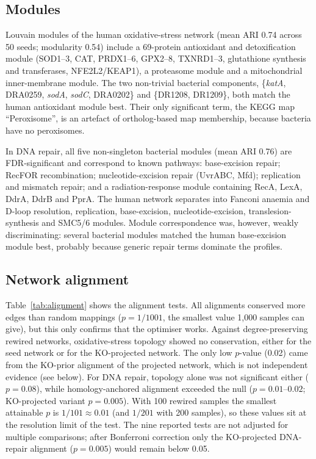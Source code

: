 \documentclass[conference]{IEEEtran}
\newcommand{\gene}[1]{\textit{#1}}
\begin{document}
\subsection{Modules}

Louvain modules of the human oxidative-stress network (mean ARI 0.74 across 50 seeds; modularity
0.54) include a 69-protein antioxidant and detoxification module (SOD1--3, CAT, PRDX1--6,
GPX2--8, TXNRD1--3, glutathione synthesis and transferases, NFE2L2/KEAP1), a proteasome module and a
mitochondrial inner-membrane module. The two non-trivial bacterial components, \{\gene{katA},
DRA0259, \gene{sodA}, \gene{sodC}, DRA0202\} and \{DR1208, DR1209\}, both match the human
antioxidant module best. Their only significant term, the KEGG map ``Peroxisome'', is an artefact
of ortholog-based map membership, because bacteria have no peroxisomes.

In DNA repair, all five non-singleton bacterial modules (mean ARI 0.76) are FDR-significant and
correspond to known pathways: base-excision repair; RecFOR recombination; nucleotide-excision
repair (UvrABC, Mfd); replication and mismatch repair; and a radiation-response module containing
RecA, LexA, DdrA, DdrB and PprA. The human network separates into Fanconi anaemia and D-loop
resolution, replication, base-excision, nucleotide-excision, translesion-synthesis and SMC5/6
modules. Module correspondence was, however, weakly discriminating: several bacterial modules
matched the human base-excision module best, probably because generic repair terms dominate the
profiles.

\subsection{Network alignment}

Table~\ref{tab:alignment} shows the alignment tests. All alignments conserved more edges than
random mappings ($p = 1/1001$, the smallest value 1,000 samples can give), but this only confirms
that the optimiser works. Against degree-preserving rewired networks, oxidative-stress topology
showed no conservation, either for
the seed network or for the KO-projected network. The only low $p$-value (0.02) came from the
KO-prior alignment of the projected network, which is not independent evidence (see below). For
DNA repair, topology alone was not significant either ($p = 0.08$), while homology-anchored alignment
exceeded the null ($p = 0.01$--$0.02$; KO-projected variant $p = 0.005$). With 100 rewired samples the
smallest attainable $p$ is $1/101 \approx 0.01$ (and $1/201$ with 200 samples), so these values
sit at the resolution limit of the test. The nine reported tests are not adjusted for multiple
comparisons; after Bonferroni correction only the KO-projected DNA-repair alignment ($p = 0.005$)
would remain below 0.05.
\end{document}
